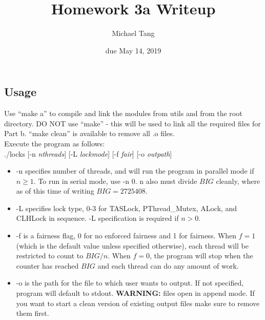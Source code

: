 \documentclass{article}
\title{Homework 3a Writeup}
\author{Michael Tang}
\date{due May 14, 2019}
\begin{document}
\maketitle
\begin{adjustwidth}{-2cm}{-2cm}
\section{Usage}
Use ``make a'' to compile and link the modules from utils and from the root directory. DO NOT use ``make'' - this will be used to link all the required files for Part b. ``make clean'' is available to remove all .o files.\\
Execute the program as follows:\\
./locks [-n \textit{nthreads}] [-L \textit{lockmode}] [-f \textit{fair}] [-o \textit{outpath}]
\begin{itemize}
	\item -n specifies number of threads, and will run the program in parallel mode if $n \geq 1$. To run in serial mode, use -n 0. n also must divide $BIG$ cleanly, where as of this time of writing $BIG = 2725408$.
	\item -L specifies lock type, 0-3 for TASLock, PThread\_Mutex, ALock, and CLHLock in sequence. -L specification is required if $n > 0$.
	\item -f is a fairness flag, 0 for no enforced fairness and 1 for fairness. When $f = 1$ (which is the default value unless specified otherwise), each thread will be restricted to count to $BIG/n$. When $f=0$, the program will stop when the counter has reached $BIG$ and each thread can do any amount of work.
	\item -o is the path for the file to which user wants to output. If not specified, program will default to stdout. \textbf{WARNING:} files open in append mode. If you want to start a clean version of existing output files make sure to remove them first.
\end{itemize} 


\end{adjustwidth}
\end{document}
